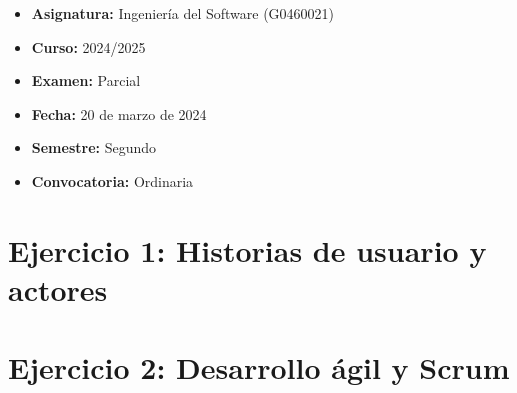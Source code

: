 \begin{itemize}
    \item \textbf{Asignatura:} Ingeniería del Software (G0460021)
    \item \textbf{Curso:} 2024/2025
    \item \textbf{Examen:} Parcial
    \item \textbf{Fecha:} 20 de marzo de 2024
    \item \textbf{Semestre:} Segundo
    \item \textbf{Convocatoria:} Ordinaria
\end{itemize}


\section{Ejercicio 1: Historias de usuario y actores}\label{sec:ejercicio-1-ex2024}


\section{Ejercicio 2: Desarrollo ágil y Scrum}\label{sec:ejercicio-2-ex2024}
